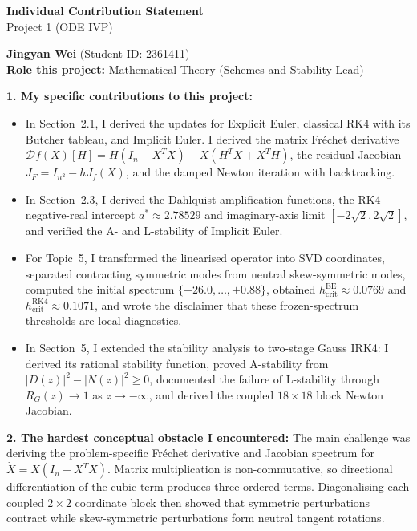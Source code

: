 \documentclass[10pt,a4paper]{article}
\begin{document}
\begin{center}
{\Large\bfseries Individual Contribution Statement}\\[0.15em]
{\large Project 1 (ODE IVP)}
\end{center}
\begin{formbox}
\footnotesize
\textbf{Jingyan Wei} (Student ID: 2361411)\\
\textbf{Role this project:} Mathematical Theory (Schemes and Stability Lead)

\textbf{1. My specific contributions to this project:}
\begin{itemize}[leftmargin=1.3em,itemsep=1pt,topsep=1pt]
    \item In Section~2.1, I derived the updates for Explicit Euler, classical
    RK4 with its Butcher tableau, and Implicit Euler. I derived the matrix
    Fr\'echet derivative
    $\mathcal{D}f(X)[H]=H(I_n-X^TX)-X(H^TX+X^TH)$, the residual Jacobian
    $J_F=I_{n^2}-hJ_f(X)$, and the damped Newton iteration with backtracking.
    \item In Section~2.3, I derived the Dahlquist amplification functions,
    the RK4 negative-real intercept $a^*\approx2.78529$ and imaginary-axis
    limit $[-2\sqrt2,2\sqrt2]$, and verified the A- and L-stability of
    Implicit Euler.
    \item For Topic~5, I transformed the linearised operator into SVD
    coordinates, separated contracting symmetric modes from neutral
    skew-symmetric modes, computed the initial spectrum
    $\{-26.0,\ldots,+0.88\}$, obtained
    $h_{\mathrm{crit}}^{\mathrm{EE}}\approx0.0769$ and
    $h_{\mathrm{crit}}^{\mathrm{RK4}}\approx0.1071$, and wrote the disclaimer
    that these frozen-spectrum thresholds are local diagnostics.
    \item In Section~5, I extended the stability analysis to two-stage Gauss
    IRK4: I derived its rational stability function, proved A-stability from
    $|D(z)|^2-|N(z)|^2\geq0$, documented the failure of L-stability through
    $R_G(z)\to1$ as $z\to-\infty$, and derived the coupled $18\times18$ block
    Newton Jacobian.
\end{itemize}

\textbf{2. The hardest conceptual obstacle I encountered:}
The main challenge was deriving the problem-specific Fr\'echet derivative and
Jacobian spectrum for $\dot X=X(I_n-X^TX)$. Matrix multiplication is
non-commutative, so directional differentiation of the cubic term produces
three ordered terms. Diagonalising each coupled $2\times2$ coordinate block
then showed that symmetric perturbations contract while skew-symmetric
perturbations form neutral tangent rotations.


\end{formbox}
\end{document}
